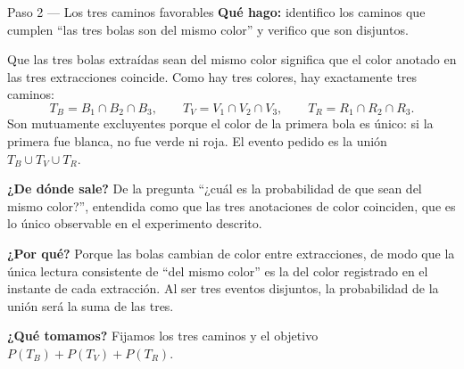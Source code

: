 \documentclass[11pt]{article}
\begin{document}
\begin{paso}{Paso 2 --- Los tres caminos favorables}
\textbf{Qué hago:} identifico los caminos que cumplen ``las tres bolas son del mismo color'' y verifico que son disjuntos.

Que las tres bolas extraídas sean del mismo color significa que el color anotado en las tres extracciones coincide. Como hay tres colores, hay exactamente tres caminos:
\[
T_B=B_1\cap B_2\cap B_3,
\qquad
T_V=V_1\cap V_2\cap V_3,
\qquad
T_R=R_1\cap R_2\cap R_3 .
\]
Son mutuamente excluyentes porque el color de la primera bola es único: si la primera fue blanca, no fue verde ni roja. El evento pedido es la unión $T_B\cup T_V\cup T_R$.

\textbf{¿De dónde sale?} De la pregunta ``¿cuál es la probabilidad de que sean del mismo color?'', entendida como que las tres anotaciones de color coinciden, que es lo único observable en el experimento descrito.

\textbf{¿Por qué?} Porque las bolas cambian de color entre extracciones, de modo que la única lectura consistente de ``del mismo color'' es la del color registrado en el instante de cada extracción. Al ser tres eventos disjuntos, la probabilidad de la unión será la suma de las tres.

\textbf{¿Qué tomamos?} Fijamos los tres caminos y el objetivo $P(T_B)+P(T_V)+P(T_R)$.
\end{paso}
\end{document}
